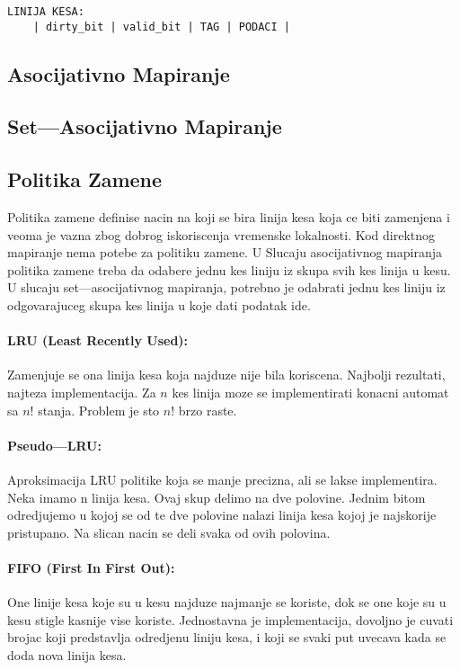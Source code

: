 \documentclass[12p,a4paper]{article}
\begin{document}
\begin{multicols}{2}
    \begin{lstlisting}
LINIJA KESA:
    | dirty_bit | valid_bit | TAG | PODACI |
    \end{lstlisting}


    \subsection{Asocijativno Mapiranje}

    \subsection{Set---Asocijativno Mapiranje}
    
    \subsection{Politika Zamene}

    Politika zamene definise nacin na koji se bira linija kesa koja ce 
    biti zamenjena i veoma je vazna zbog dobrog iskoriscenja vremenske
    lokalnosti. Kod direktnog mapiranje nema potebe za politiku zamene.
    U Slucaju asocijativnog mapiranja politika zamene treba da odabere jednu
    kes liniju iz skupa svih kes linija u kesu. U slucaju set---asocijativnog
    mapiranja, potrebno je odabrati jednu kes liniju iz odgovarajuceg skupa
    kes linija u koje dati podatak ide.

    \paragraph{LRU (Least Recently Used):}
    Zamenjuje se ona linija kesa koja najduze nije bila koriscena. Najbolji
    rezultati, najteza implementacija. Za $n$ kes linija moze se 
    implementirati konacni automat sa $n! $ stanja. Problem je sto $n! $ brzo
    raste.

    \paragraph{Pseudo---LRU:}
    Aproksimacija LRU politike koja se manje precizna, ali se lakse 
    implementira. Neka imamo n linija kesa. Ovaj skup delimo na dve polovine.
    Jednim bitom odredjujemo u kojoj se od te dve polovine nalazi linija kesa
    kojoj je najskorije pristupano. Na slican nacin se deli svaka od ovih
    polovina.

    \paragraph{FIFO (First In First Out):}
    One linije kesa koje su u kesu najduze najmanje se koriste, dok se one 
    koje su u kesu stigle kasnije vise koriste. Jednostavna je implementacija,
    dovoljno je cuvati brojac koji predstavlja odredjenu liniju kesa, i
    koji se svaki put uvecava kada se doda nova linija kesa.


\end{multicols}
\end{document}
